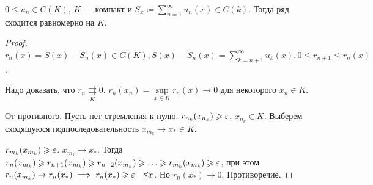 \begin{theorem}
    $0 \le u_n \in C(K)$, $K$ --- компакт и  $S_x \coloneqq \sum\limits_{n=1}^\infty u_n(x) \in C(k)$. Тогда ряд сходится равномерно на  $K$.
\end{theorem}
\begin{proof}
    $r_n(x) = S(x) - S_n(x) \in C(K), S(x) - S_n(x) = \sum\limits_{k=n+1}^\infty u_k(x), 0 \le r_{n+1} \le r_n(x)$.

    Надо доказать, что $r_n \underset{K}{\rightrightarrows} 0$.  $r_n(x_n) = \sup\limits_{x \in K} r_n(x) \to 0$ для некоторого $x_n \in K$.

    От противного. Пусть нет стремления к нулю.  $r_{n_k}(x_{n_k}) \geqslant \varepsilon$, $x_{n_k} \in K$. Выберем сходящуюся подпоследовательность  $x_{m_k} \to x_* \in K$.

     $r_{m_k}(x_{m_k}) \geqslant \varepsilon$. $x_{m_k} \to x_*$. Тогда  $r_n(x_{m_k}) \geqslant r_{n+1}(x_{m_k}) \geqslant r_{n+2}(x_{m_k}) \geqslant \ldots \geqslant r_{m_k}(x_{m_k}) \geqslant \varepsilon$, при этом $r_n(x_{m_k}) \to r_n(x_*) \implies r_n(x_*) \geqslant \varepsilon \quad \forall x$. Но $r_n(x_*) \to 0$. Противоречие.
\end{proof}

